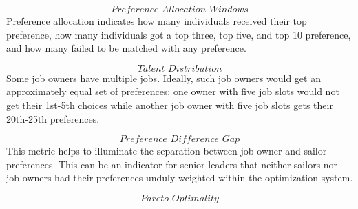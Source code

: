 \[\textit{Preference Allocation Windows}\]
Preference allocation indicates how many individuals received their top preference, how many individuals got a top three, top five, and top 10 preference, and how many failed to be matched with any preference.

\[\textit{Talent Distribution}\]
Some job owners have multiple jobs. Ideally, such job owners would get an approximately equal set of preferences; one owner with five job slots would not get their 1st-5th choices while another job owner with five job slots gets their 20th-25th preferences. 

\[\textit{Preference Difference Gap}\]
This metric helps to illuminate the separation between job owner and sailor preferences. This can be an indicator for senior leaders that neither sailors nor job owners had their preferences unduly weighted within the optimization system.  

\[\textit{Pareto Optimality}\]